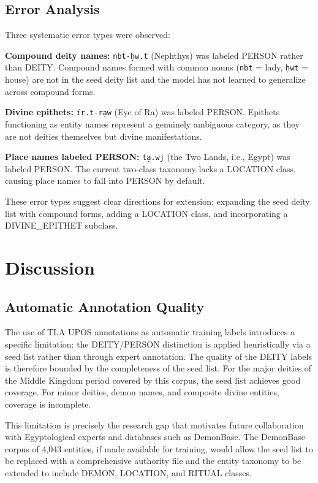 \documentclass[11pt]{article}
\begin{document}
\subsection{Error Analysis}

Three systematic error types were observed:

\textbf{Compound deity names:} \texttt{nbt-\d{h}w.t} (Nephthys) was labeled PERSON rather than DEITY. Compound names formed with common nouns (\texttt{nbt} = lady, \texttt{\d{h}wt} = house) are not in the seed deity list and the model has not learned to generalize across compound forms.

\textbf{Divine epithets:} \texttt{\textit{i}r.t-r\d{a}w} (Eye of Ra) was labeled PERSON. Epithets functioning as entity names represent a genuinely ambiguous category, as they are not deities themselves but divine manifestations.

\textbf{Place names labeled PERSON:} \texttt{t\d{a}.wj} (the Two Lands, i.e., Egypt) was labeled PERSON. The current two-class taxonomy lacks a LOCATION class, causing place names to fall into PERSON by default.

These error types suggest clear directions for extension: expanding the seed deity list with compound forms, adding a LOCATION class, and incorporating a DIVINE\_EPITHET subclass.

\section{Discussion}

\subsection{Automatic Annotation Quality}

The use of TLA UPOS annotations as automatic training labels introduces a specific limitation: the DEITY/PERSON distinction is applied heuristically via a seed list rather than through expert annotation. The quality of the DEITY labels is therefore bounded by the completeness of the seed list. For the major deities of the Middle Kingdom period covered by this corpus, the seed list achieves good coverage. For minor deities, demon names, and composite divine entities, coverage is incomplete.

This limitation is precisely the research gap that motivates future collaboration with Egyptological experts and databases such as DemonBase. The DemonBase corpus of 4,043 entities, if made available for training, would allow the seed list to be replaced with a comprehensive authority file and the entity taxonomy to be extended to include DEMON, LOCATION, and RITUAL classes.
\end{document}
